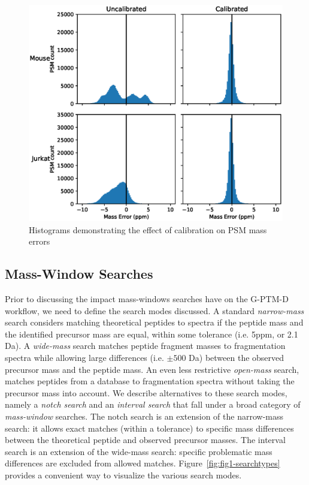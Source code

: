 \documentclass[journal=jprobs,manuscript=article]{achemso}
\begin{document}
\begin{figure}
  \includegraphics{fig2-calibrationQuality.eps}
  \caption{Histograms demonstrating the effect of calibration on PSM mass errors}
  \label{fgr:figure1}
\end{figure}

\newpage

\subsection{Mass-Window Searches}

Prior to discussing the impact mass-windows searches have on the G-PTM-D workflow, we need to define the search modes discussed. A standard \textit{narrow-mass} search considers matching theoretical peptides to spectra if the peptide mass and the identified precursor mass are equal, within some tolerance (i.e. 5ppm, or 2.1 Da).
A \textit{wide-mass} search matches peptide fragment masses to fragmentation spectra while allowing large differences (i.e. $\pm 500$ Da) between the observed precursor mass and the peptide mass.
An even less restrictive \textit{open-mass} search, matches peptides from a database to fragmentation spectra without taking the precursor mass into account.
We describe alternatives to these search modes, namely a \textit{notch search} and an \textit{interval search} that fall under a broad category of \textit{mass-window} searches.
The notch search is an extension of the narrow-mass search: it allows exact matches (within a tolerance) to specific mass differences between the theoretical peptide and observed precursor masses.
The interval search is an extension of the wide-mass search: specific problematic mass differences are excluded from allowed matches.
Figure~\ref{fig:fig1-searchtypes} provides a convenient way to visualize the various search modes.
\end{document}
